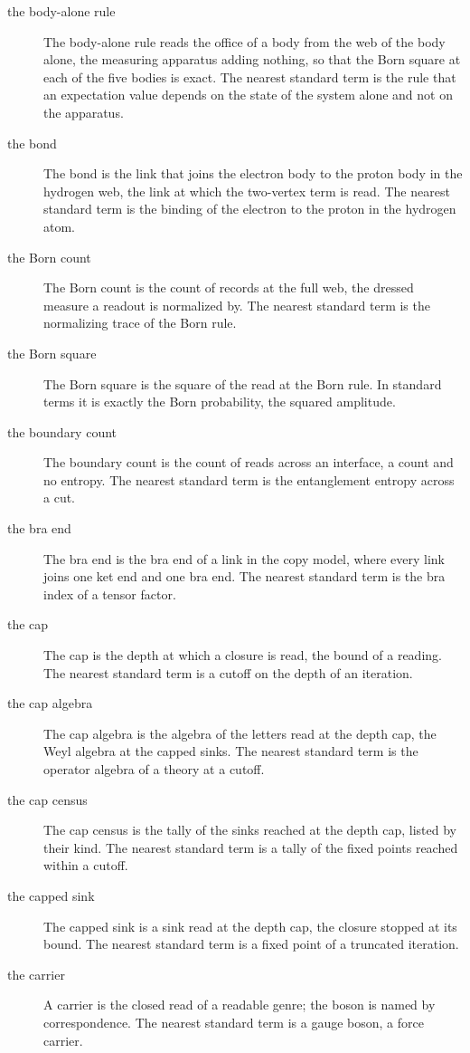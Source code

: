 \begin{description}
\item[the body-alone rule] The body-alone rule reads the office of a body from the web of the body alone, the measuring apparatus adding nothing, so that the Born square at each of the five bodies is exact. The nearest standard term is the rule that an expectation value depends on the state of the system alone and not on the apparatus.
\item[the bond] The bond is the link that joins the electron body to the proton body in the hydrogen web, the link at which the two-vertex term is read. The nearest standard term is the binding of the electron to the proton in the hydrogen atom.
\item[the Born count] The Born count is the count of records at the full web, the dressed measure a readout is normalized by. The nearest standard term is the normalizing trace of the Born rule.
\item[the Born square] The Born square is the square of the read at the Born rule. In standard terms it is exactly the Born probability, the squared amplitude.
\item[the boundary count] The boundary count is the count of reads across an interface, a count and no entropy. The nearest standard term is the entanglement entropy across a cut.
\item[the bra end] The bra end is the bra end of a link in the copy model, where every link joins one ket end and one bra end. The nearest standard term is the bra index of a tensor factor.
\item[the cap] The cap is the depth at which a closure is read, the bound of a reading. The nearest standard term is a cutoff on the depth of an iteration.
\item[the cap algebra] The cap algebra is the algebra of the letters read at the depth cap, the Weyl algebra at the capped sinks. The nearest standard term is the operator algebra of a theory at a cutoff.
\item[the cap census] The cap census is the tally of the sinks reached at the depth cap, listed by their kind. The nearest standard term is a tally of the fixed points reached within a cutoff.
\item[the capped sink] The capped sink is a sink read at the depth cap, the closure stopped at its bound. The nearest standard term is a fixed point of a truncated iteration.
\item[the carrier] A carrier is the closed read of a readable genre; the boson is named by correspondence. The nearest standard term is a gauge boson, a force carrier.

\end{description}
